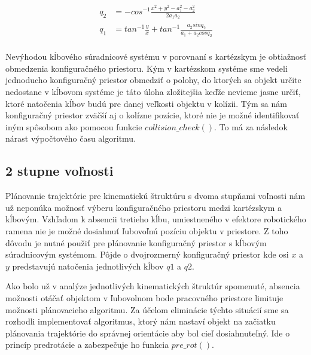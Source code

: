 \begin{equation}
	\begin{aligned}
		q_2&= - cos^{-1} \frac{x^2 + y^2 - a_1^2 - a_2^2}{2 a_1 a_2 }\\
		q_1&=  tan^{-1} \frac{y}{x} + tan^{-1} \frac{a_2 sinq_2}{a_1 + a_2 cos q_2} \\
	\end{aligned}
	\label{e4 - hore} 
\end{equation}


Nevýhodou kĺbového súradnicové systému v porovnaní s kartézskym je obtiažnosť obmedzenia konfiguračného priestoru. Kým v kartézskom systéme sme vedeli jednoducho konfiguračný priestor obmedziť o polohy, do ktorých sa objekt určite nedostane v kĺbovom systéme je táto úloha zložitejšia keďže nevieme jasne určiť, ktoré natočenia kĺbov budú pre danej veľkosti objektu v kolízii. Tým sa nám konfiguračný priestor zväčší aj o kolízne pozície, ktoré nie je možné identifikovať iným spôsobom ako pomocou funkcie $ collision\_check() $. To má za následok nárast výpočtového času algoritmu.

\subsection{2 stupne voľnosti}

Plánovanie trajektórie pre kinematickú štruktúru s dvoma stupňami voľnosti nám už neponúka možnosť výberu konfiguračného priestoru medzi kartézskym a kĺbovým. Vzhľadom k absencii tretieho kĺbu, umiestneného v efektore robotického ramena nie je možné dosiahnuť ľubovoľnú  pozíciu objektu v priestore. Z toho dôvodu je nutné použiť pre plánovanie konfiguračný priestor s kĺbovým súradnicovým systémom. Pôjde o dvojrozmerný konfiguračný priestor kde osi $ x $ a $ y $ predstavujú natočenia jednotlivých kĺbov $ q1 $ a $ q2 $.  \newline

Ako bolo už v analýze jednotlivých kinematických štruktúr spomenuté, absencia možnosti otáčať objektom v ľubovolnom bode pracovného priestore limituje možnosti plánovacieho algoritmu. Za účelom eliminácie týchto situácií sme sa rozhodli implementovať algoritmus, ktorý nám nastaví objekt na začiatku plánovania trajektórie do správnej orientácie aby bol cieľ dosiahnuteľný. Ide o princíp predrotácie a zabezpečuje ho funkcia $ pre\_rot() $.

